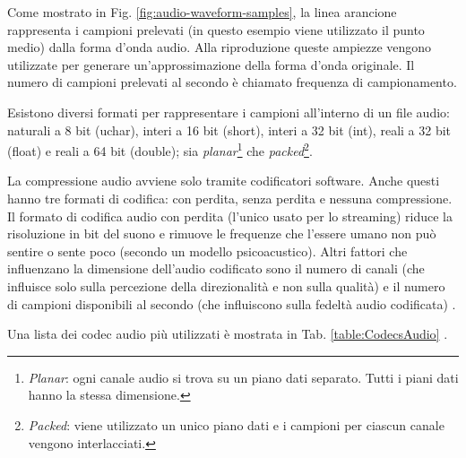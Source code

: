 Come mostrato in Fig. \ref{fig:audio-waveform-samples}, la linea arancione rappresenta i campioni prelevati (in questo esempio viene utilizzato il punto medio) dalla forma d'onda audio. Alla riproduzione queste ampiezze vengono utilizzate per generare un'approssimazione della forma d'onda originale. Il numero di campioni prelevati al secondo è chiamato frequenza di campionamento.

Esistono diversi formati per rappresentare i campioni all'interno di un file audio: naturali a 8 bit (uchar), interi a 16 bit (short), interi a 32 bit (int), reali a 32 bit (float) e reali a 64 bit (double); sia \textit{planar}\footnote{\textit{Planar}: ogni canale audio si trova su un piano dati separato. Tutti i piani dati hanno la stessa dimensione.} che \textit{packed}\footnote{\textit{Packed}: viene utilizzato un unico piano dati e i campioni per ciascun canale vengono interlacciati.}.

La compressione audio avviene solo tramite codificatori software. Anche questi hanno tre formati di codifica: con perdita, senza perdita e nessuna compressione. Il formato di codifica audio con perdita (l'unico usato per lo streaming) riduce la risoluzione in bit del suono e rimuove le frequenze che l'essere umano non può sentire o sente poco (secondo un modello psicoacustico). Altri fattori che influenzano la dimensione dell'audio codificato sono il numero di canali (che influisce solo sulla percezione della direzionalità e non sulla qualità) e il numero di campioni disponibili al secondo (che influiscono sulla fedeltà audio codificata) \parencite{AudioSignalProcessingAndCoding}.




Una lista dei codec audio più utilizzati è mostrata in Tab. \ref{table:CodecsAudio} \parencite{WebAudioCodecGuide}.

